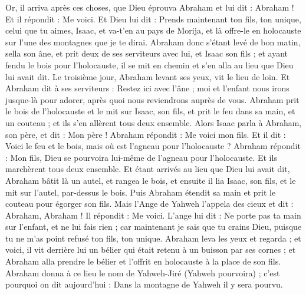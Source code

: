 \begin{multicols}{2}
\VerseOne{}Or, il arriva après ces choses, que Dieu éprouva Abraham et lui dit : Abraham ! Et il répondit : Me voici.
Et Dieu lui dit : Prends maintenant ton fils, ton unique, celui que tu aimes, Isaac, et va-t'en au pays de Morija, et là offre-le en holocauste sur l'une des montagnes que je te dirai.
Abraham donc s'étant levé de bon matin, sella son âne, et prit deux de ses serviteurs avec lui, et Isaac son fils ; et ayant fendu le bois pour l'holocauste, il se mit en chemin et s'en alla au lieu que Dieu lui avait dit.
Le troisième jour, Abraham levant ses yeux, vit le lieu de loin.
Et Abraham dit à ses serviteurs : Restez ici avec l'âne ; moi et l'enfant nous irons jusque-là pour adorer, après quoi nous reviendrons auprès de vous.
Abraham prit le bois de l'holocauste et le mit sur Isaac, son fils, et prit le feu dans sa main, et un couteau ; et ils s'en allèrent tous deux ensemble.
Alors Isaac parla à Abraham, son père, et dit : Mon père ! Abraham répondit : Me voici mon fils. Et il dit : Voici le feu et le bois, mais où est l’agneau pour l'holocauste ?
Abraham répondit : Mon fils, Dieu se pourvoira lui-même de l’agneau pour l'holocauste. Et ils marchèrent tous deux ensemble.
Et étant arrivés au lieu que Dieu lui avait dit, Abraham bâtit là un autel, et rangea le bois, et ensuite il lia Isaac, son fils, et le mit sur l'autel, par-dessus le bois.
Puis Abraham étendit sa main et prit le couteau pour égorger son fils.
Mais l'Ange de Yahweh l’appela des cieux et dit : Abraham, Abraham ! Il répondit : Me voici.
L’ange lui dit : Ne porte pas ta main sur l'enfant, et ne lui fais rien ; car maintenant je sais que tu crains Dieu, puisque tu ne m’as point refusé ton fils, ton unique.
Abraham leva les yeux et regarda ; et voici,  il vit derrière lui un bélier qui était retenu à un buisson par ses cornes ; et Abraham alla prendre le bélier et l'offrit en holocauste à la place de son fils.
Abraham donna à ce lieu le nom de Yahweh-Jiré (Yahweh pourvoira) ; c'est pourquoi on dit aujourd'hui : Dans la montagne de Yahweh il y sera pourvu.

\end{multicols}
